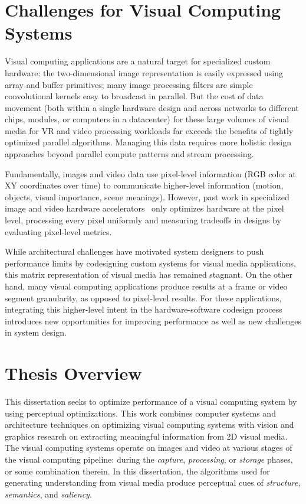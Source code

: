 \section{Challenges for Visual Computing Systems}
Visual computing applications are a natural target for specialized custom hardware: the two-dimensional image representation is easily expressed using array and buffer primitives; many image processing filters are simple convolutional kernels easy to broadcast in parallel.
But the cost of data movement (both within a single hardware design and across networks to different chips, modules, or computers in a datacenter) for these large volumes of visual media for VR and video processing workloads far exceeds the benefits of tightly optimized parallel algorithms.
Managing this data requires more holistic design approaches beyond parallel compute patterns and stream processing.

Fundamentally, images and video data use pixel-level information (RGB color at XY coordinates over time) to communicate higher-level information (motion, objects, visual importance, scene meanings).
However, past work in specialized image and video hardware accelerators~\cite{hauswald2014hybrid, convolution_engine, adams2010frankencamera} only optimizes hardware at the pixel level, processing every pixel uniformly and measuring tradeoffs in designs by evaluating pixel-level metrics.

While architectural challenges have motivated system designers to push performance limits by codesigning custom systems for visual media applications, this matrix representation of visual media has remained stagnant.
On the other hand, many visual computing applications produce results at a frame or video segment granularity, as opposed to pixel-level results.
For these applications, integrating this higher-level intent in the hardware-software codesign process introduces new opportunities for improving performance as well as new challenges in system design.

\section{Thesis Overview}
This dissertation seeks to optimize performance of a visual computing system by using perceptual optimizations.
This work combines computer systems and architecture techniques on optimizing visual computing systems with vision and graphics research on extracting meaningful information from 2D visual media.
The visual computing systems operate on images and video at various stages of the visual computing pipeline: during the \emph{capture}, \emph{processing}, or \emph{storage} phases, or some combination therein.
In this dissertation, the algorithms used for generating understanding from visual media produce perceptual cues of \emph{structure}, \emph{semantics}, and \emph{saliency}.

